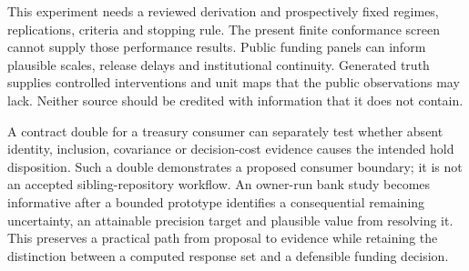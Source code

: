 This experiment needs a reviewed derivation and prospectively fixed
regimes, replications, criteria and stopping rule. The present finite
conformance screen cannot supply those performance results. Public funding
panels can inform plausible scales, release delays and institutional
continuity. Generated truth supplies controlled interventions and unit maps
that the public observations may lack. Neither source should be credited
with information that it does not contain.

A contract double for a treasury consumer can separately test whether absent
identity, inclusion, covariance or decision-cost evidence causes the intended
hold disposition. Such a double demonstrates a proposed consumer boundary;
it is not an accepted sibling-repository workflow. An owner-run bank study
becomes informative after a bounded prototype identifies a consequential
remaining uncertainty, an attainable precision target and plausible value
from resolving it. This preserves a practical path from proposal to evidence
while retaining the distinction between a computed response set and a
defensible funding decision.
\label{exec13:funding-journey-end}
